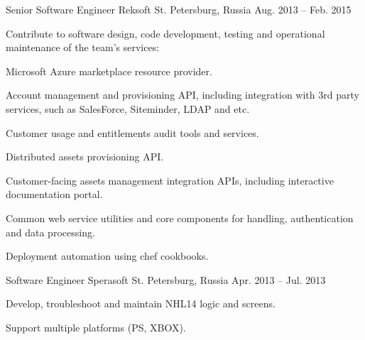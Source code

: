 \begin{cventries}
  \cventry
    {Senior Software Engineer} %
    {Reksoft} %
    {St. Petersburg, Russia} %
    {Aug. 2013 -- Feb. 2015} %
    {
      \responsibilities
        {Contribute to software design, code development, testing and
        operational maintenance of the team's services:}
      \begin{cvitems} %
        \item {Microsoft Azure marketplace resource provider.}
        \item {Account management and provisioning API, including integration with 3rd party services, such as SalesForce, Siteminder, LDAP and etc.}
        \item {Customer usage and entitlements audit tools and services.}
        \item {Distributed assets provisioning API.}
        \item {Customer-facing assets management integration APIs, including interactive documentation portal.}
        \item {Common web service utilities and core components for handling, authentication and data processing.}
        \item {Deployment automation using chef cookbooks.}
      \end{cvitems}
    }

  \cventry
    {Software Engineer} %
    {Sperasoft} %
    {St. Petersburg, Russia} %
    {Apr. 2013 -- Jul. 2013} %
    {
      \begin{cvitems} %
        \item {Develop, troubleshoot and maintain NHL14 logic and screens.}
        \item {Support multiple platforms (PS, XBOX).}
      \end{cvitems}
    }


\end{cventries}
